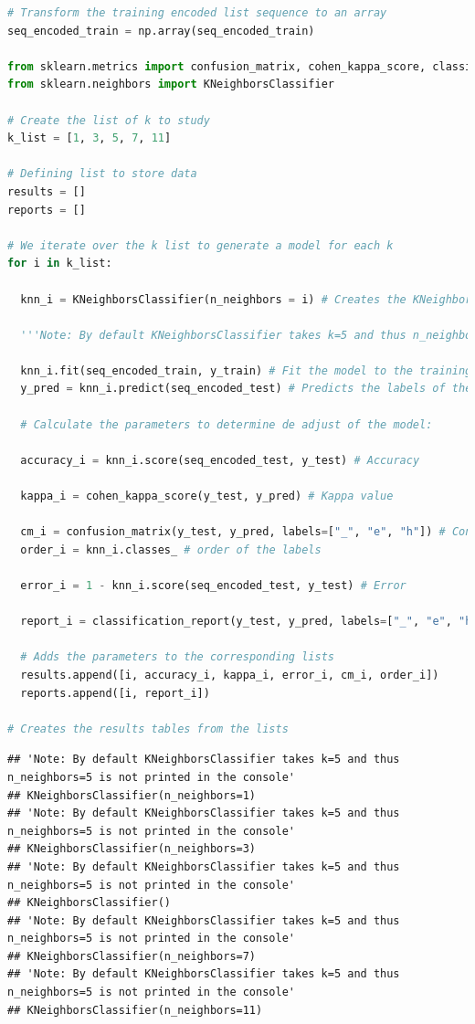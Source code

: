 \documentclass[
]{article}
\begin{document}
\begin{lstlisting}[language=Python]
# Transform the training encoded list sequence to an array
seq_encoded_train = np.array(seq_encoded_train)

from sklearn.metrics import confusion_matrix, cohen_kappa_score, classification_report
from sklearn.neighbors import KNeighborsClassifier

# Create the list of k to study
k_list = [1, 3, 5, 7, 11]

# Defining list to store data
results = []
reports = []

# We iterate over the k list to generate a model for each k
for i in k_list:

  knn_i = KNeighborsClassifier(n_neighbors = i) # Creates the KNeighborsClassifier object with k=i
  
  '''Note: By default KNeighborsClassifier takes k=5 and thus n_neighbors=5 is not printed in the console'''
  
  knn_i.fit(seq_encoded_train, y_train) # Fit the model to the training set
  y_pred = knn_i.predict(seq_encoded_test) # Predicts the labels of the test data
  
  # Calculate the parameters to determine de adjust of the model:
  
  accuracy_i = knn_i.score(seq_encoded_test, y_test) # Accuracy
  
  kappa_i = cohen_kappa_score(y_test, y_pred) # Kappa value
  
  cm_i = confusion_matrix(y_test, y_pred, labels=["_", "e", "h"]) # Confusion matrix
  order_i = knn_i.classes_ # order of the labels

  error_i = 1 - knn_i.score(seq_encoded_test, y_test) # Error
  
  report_i = classification_report(y_test, y_pred, labels=["_", "e", "h"]) # Report
  
  # Adds the parameters to the corresponding lists
  results.append([i, accuracy_i, kappa_i, error_i, cm_i, order_i])
  reports.append([i, report_i])
  
# Creates the results tables from the lists
\end{lstlisting}

\begin{lstlisting}
## 'Note: By default KNeighborsClassifier takes k=5 and thus n_neighbors=5 is not printed in the console'
## KNeighborsClassifier(n_neighbors=1)
## 'Note: By default KNeighborsClassifier takes k=5 and thus n_neighbors=5 is not printed in the console'
## KNeighborsClassifier(n_neighbors=3)
## 'Note: By default KNeighborsClassifier takes k=5 and thus n_neighbors=5 is not printed in the console'
## KNeighborsClassifier()
## 'Note: By default KNeighborsClassifier takes k=5 and thus n_neighbors=5 is not printed in the console'
## KNeighborsClassifier(n_neighbors=7)
## 'Note: By default KNeighborsClassifier takes k=5 and thus n_neighbors=5 is not printed in the console'
## KNeighborsClassifier(n_neighbors=11)
\end{lstlisting}
\end{document}
